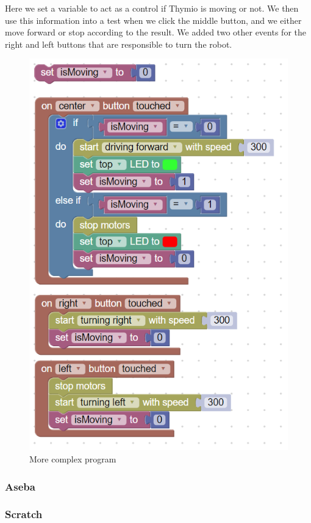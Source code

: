 \documentclass{scrartcl}
\begin{document}
Here we set a variable to act as a control if Thymio is moving or not. We then use this information into a test when we click the middle button, and we either move forward or stop according to the result. 
We added two other events for the right and left buttons that are responsible to turn the robot.
\begin{figure}
  \centering
  \includegraphics[scale=0.5]{./Blockly/advanced_program}
  \caption{More complex program}
  \label{fig:thymio_blockly_advanced_program}
\end{figure}

\subsubsection{Aseba}
\subsubsection{Scratch}
\end{document}
